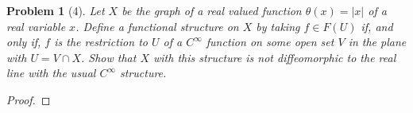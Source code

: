 \documentclass[10pt]{article}
\newcommand{\sk}{\vskip 10mm}
\theoremstyle{plain}
\newtheorem{problem}{Problem}
\theoremstyle{remark}
\begin{document}
\sk

\begin{problem}[4]
  Let $X$ be the graph of a real valued function $\theta(x)=|x|$ of a real
  variable $x$. Define a functional structure on $X$ by taking $f\in F(U)$
  if, and only if, $f$ is the restriction to $U$ of a $C^\infty$ function on some
  open set $V$ in the plane with $U=V\cap X$. Show that $X$ with this structure
  is \textit{not} diffeomorphic to the real line with the usual $C^\infty$ structure.
\end{problem}

\begin{proof}
  
\end{proof}

\sk

\end{document}
